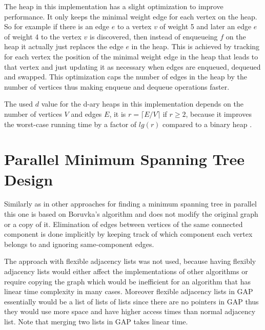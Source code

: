 \documentclass{report}
\theoremstyle{plain}
\theoremstyle{definition}
\theoremstyle{remark}
\begin{document}
The heap in this implementation has a slight optimization to improve performance. It only keeps the minimal weight edge for each vertex on the heap. So for example if there is an edge $e$ to a vertex $v$ of weight 5 and later an edge $e$ of weight 4 to the vertex $v$ is discovered, then instead of enqueueing $f$ on the heap it actually just replaces the edge $e$ in the heap. This is achieved by tracking for each vertex the position of the minimal weight edge in the heap that leads to that vertex and just updating it as necessary when edges are enqueued, dequeued and swapped. This optimization caps the number of edges in the heap by the number of vertices thus making enqueue and dequeue operations faster.

The used $d$ value for the d-ary heaps in this implementation depends on the number of vertices $V$ and edges $E$, it is $r=\lceil E/V \rceil$ if $r \geq 2$, because it improves the worst-case running time by a factor of $lg(r)$ compared to a binary heap \cite{algo_sedgewick}.

\section{Parallel Minimum Spanning Tree Design}

Similarly as in other approaches \cite{Bader20061366} for finding a minimum spanning tree in parallel this one is based on Boruvka's algorithm and does not modify the original graph or a copy of it. Elimination of edges between vertices of the same connected component is done implicitly by keeping track of which component each vertex belongs to and ignoring same-component edges.

The approach with flexible adjacency lists \cite{Bader20061366} was not used, because having flexibly adjacency lists would either affect the implementations of other algorithms or require copying the graph which would be inefficient for an algorithm that has linear time complexity in many cases. Moreover flexible adjacency lists in GAP essentially would be a list of lists of lists since there are no pointers in GAP thus they would use more space and have higher access times than normal adjacency list. Note that merging two lists in GAP takes linear time.
\end{document}
